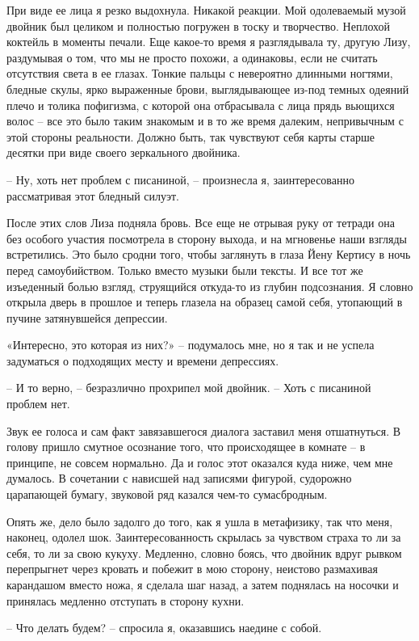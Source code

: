 \documentclass[
]{book}
\begin{document}
При виде ее лица я резко выдохнула. Никакой реакции. Мой одолеваемый музой двойник был целиком и полностью погружен в тоску и творчество. Неплохой коктейль в моменты печали. Еще какое-то время я разглядывала ту, другую Лизу, раздумывая о том, что мы не просто похожи, а одинаковы, если не считать отсутствия света в ее глазах. Тонкие пальцы с невероятно длинными ногтями, бледные скулы, ярко выраженные брови, выглядывающее из-под темных одеяний плечо и толика пофигизма, с которой она отбрасывала с лица прядь вьющихся волос -- все это было таким знакомым и в то же время далеким, непривычным с этой стороны реальности. Должно быть, так чувствуют себя карты старше десятки при виде своего зеркального двойника.

-- Ну, хоть нет проблем с писаниной, -- произнесла я, заинтересованно рассматривая этот бледный силуэт.

После этих слов Лиза подняла бровь. Все еще не отрывая руку от тетради она без особого участия посмотрела в сторону выхода, и на мгновенье наши взгляды встретились. Это было сродни того, чтобы заглянуть в глаза Йену Кертису в ночь перед самоубийством. Только вместо музыки были тексты. И все тот же изъеденный болью взгляд, струящийся откуда-то из глубин подсознания. Я словно открыла дверь в прошлое и теперь глазела на образец самой себя, утопающий в пучине затянувшейся депрессии.

«Интересно, это которая из них?» -- подумалось мне, но я так и не успела задуматься о подходящих месту и времени депрессиях.

-- И то верно, -- безразлично прохрипел мой двойник. -- Хоть с писаниной проблем нет.

Звук ее голоса и сам факт завязавшегося диалога заставил меня отшатнуться. В голову пришло смутное осознание того, что происходящее в комнате -- в принципе, не совсем нормально. Да и голос этот оказался куда ниже, чем мне думалось. В сочетании с нависшей над записями фигурой, судорожно царапающей бумагу, звуковой ряд казался чем-то сумасбродным.

Опять же, дело было задолго до того, как я ушла в метафизику, так что меня, наконец, одолел шок. Заинтересованность скрылась за чувством страха то ли за себя, то ли за свою кукуху. Медленно, словно боясь, что двойник вдруг рывком перепрыгнет через кровать и побежит в мою сторону, неистово размахивая карандашом вместо ножа, я сделала шаг назад, а затем поднялась на носочки и принялась медленно отступать в сторону кухни.

-- Что делать будем? -- спросила я, оказавшись наедине с собой.
\end{document}
